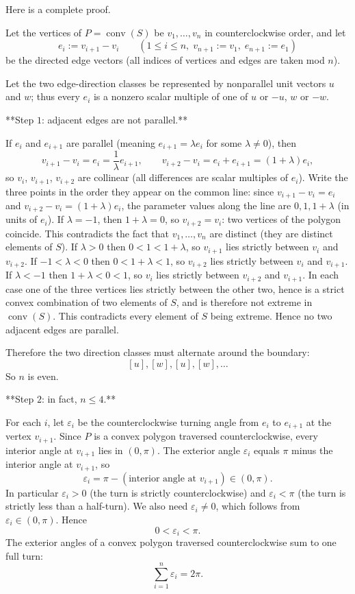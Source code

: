 Here is a complete proof.

Let the vertices of $P=\operatorname{conv}(S)$ be $v_1,\dots,v_n$ in counterclockwise order, and let
\[
e_i:=v_{i+1}-v_i\qquad (1\le i\le n,\; v_{n+1}:=v_1,\; e_{n+1}:=e_1)
\]
be the directed edge vectors (all indices of vertices and edges are taken mod $n$).

Let the two edge-direction classes be represented by nonparallel unit vectors $u$ and $w$; thus every $e_i$ is a nonzero scalar multiple of one of $u$ or $-u$, $w$ or $-w$.

**Step $1$: adjacent edges are not parallel.**

If $e_i$ and $e_{i+1}$ are parallel (meaning $e_{i+1}=\lambda e_i$ for some $\lambda\neq 0$), then
\[
v_{i+1}-v_i = e_i = \frac{1}{\lambda}e_{i+1},\qquad
v_{i+2}-v_i = e_i+e_{i+1} = (1+\lambda)e_i,
\]
so $v_i$, $v_{i+1}$, $v_{i+2}$ are collinear (all differences are scalar multiples of $e_i$). Write the three points in the order they appear on the common line: since $v_{i+1}-v_i = e_i$ and $v_{i+2}-v_i=(1+\lambda)e_i$, the parameter values along the line are $0, 1, 1+\lambda$ (in units of $e_i$). If $\lambda=-1$, then $1+\lambda=0$, so $v_{i+2}=v_i$: two vertices of the polygon coincide. This contradicts the fact that $v_1,\dots,v_n$ are distinct (they are distinct elements of $S$). If $\lambda>0$ then $0<1<1+\lambda$, so $v_{i+1}$ lies strictly between $v_i$ and $v_{i+2}$. If $-1<\lambda<0$ then $0<1+\lambda<1$, so $v_{i+2}$ lies strictly between $v_i$ and $v_{i+1}$. If $\lambda<-1$ then $1+\lambda<0<1$, so $v_i$ lies strictly between $v_{i+2}$ and $v_{i+1}$. In each case one of the three vertices lies strictly between the other two, hence is a strict convex combination of two elements of $S$, and is therefore not extreme in $\operatorname{conv}(S)$. This contradicts every element of $S$ being extreme. Hence no two adjacent edges are parallel.

Therefore the two direction classes must alternate around the boundary:
\[
[u],[w],[u],[w],\dots
\]
So $n$ is even.

**Step $2$: in fact, $n\le 4$.**

For each $i$, let $\varepsilon_i$ be the counterclockwise turning angle from $e_i$ to $e_{i+1}$ at the vertex $v_{i+1}$. Since $P$ is a convex polygon traversed counterclockwise, every interior angle at $v_{i+1}$ lies in $(0,\pi)$. The exterior angle $\varepsilon_i$ equals $\pi$ minus the interior angle at $v_{i+1}$, so
\[
\varepsilon_i = \pi - (\text{interior angle at }v_{i+1}) \in (0,\pi).
\]
In particular $\varepsilon_i>0$ (the turn is strictly counterclockwise) and $\varepsilon_i<\pi$ (the turn is strictly less than a half-turn). We also need $\varepsilon_i\neq 0$, which follows from $\varepsilon_i\in(0,\pi)$. Hence
\[
0<\varepsilon_i<\pi.
\]
The exterior angles of a convex polygon traversed counterclockwise sum to one full turn:
\[
\sum_{i=1}^n \varepsilon_i = 2\pi.
\]

